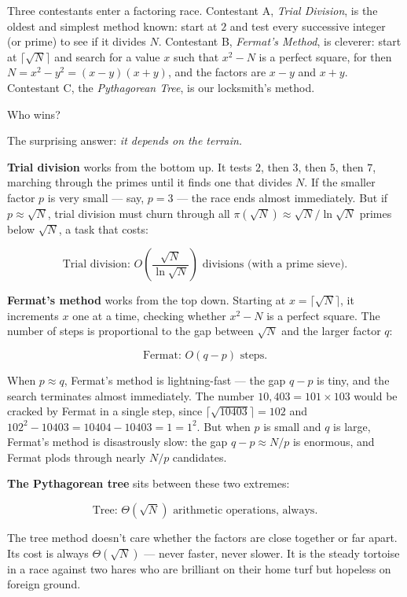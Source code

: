 \documentclass[11pt,twoside,openright]{book}
\theoremstyle{definition}
\theoremstyle{remark}
\begin{document}
Three contestants enter a factoring race. Contestant A, \textit{Trial Division}, is the oldest and simplest method known: start at $2$ and test every successive integer (or prime) to see if it divides $N$. Contestant B, \textit{Fermat's Method}, is cleverer: start at $\lceil \sqrt{N} \rceil$ and search for a value $x$ such that $x^2 - N$ is a perfect square, for then $N = x^2 - y^2 = (x - y)(x + y)$, and the factors are $x - y$ and $x + y$. Contestant C, the \textit{Pythagorean Tree}, is our locksmith's method.

Who wins?

The surprising answer: \textit{it depends on the terrain.}

\textbf{Trial division} works from the bottom up. It tests $2$, then $3$, then $5$, then $7$, marching through the primes until it finds one that divides $N$. If the smaller factor $p$ is very small --- say, $p = 3$ --- the race ends almost immediately. But if $p \approx \sqrt{N}$, trial division must churn through all $\pi(\sqrt{N}) \approx \sqrt{N} / \ln \sqrt{N}$ primes below $\sqrt{N}$, a task that costs:

\[\text{Trial division: } O\!\left(\frac{\sqrt{N}}{\ln \sqrt{N}}\right) \text{ divisions (with a prime sieve).}\]

\textbf{Fermat's method} works from the top down. Starting at $x = \lceil \sqrt{N} \rceil$, it increments $x$ one at a time, checking whether $x^2 - N$ is a perfect square. The number of steps is proportional to the gap between $\sqrt{N}$ and the larger factor $q$:

\[\text{Fermat: } O(q - p) \text{ steps.}\]

When $p \approx q$, Fermat's method is lightning-fast --- the gap $q - p$ is tiny, and the search terminates almost immediately. The number $10{,}403 = 101 \times 103$ would be cracked by Fermat in a single step, since $\lceil \sqrt{10403} \rceil = 102$ and $102^2 - 10403 = 10404 - 10403 = 1 = 1^2$. But when $p$ is small and $q$ is large, Fermat's method is disastrously slow: the gap $q - p \approx N/p$ is enormous, and Fermat plods through nearly $N / p$ candidates.

\textbf{The Pythagorean tree} sits between these two extremes:

\[\text{Tree: } \Theta(\sqrt{N}) \text{ arithmetic operations, always.}\]

The tree method doesn't care whether the factors are close together or far apart. Its cost is always $\Theta(\sqrt{N})$ --- never faster, never slower. It is the steady tortoise in a race against two hares who are brilliant on their home turf but hopeless on foreign ground.
\end{document}
